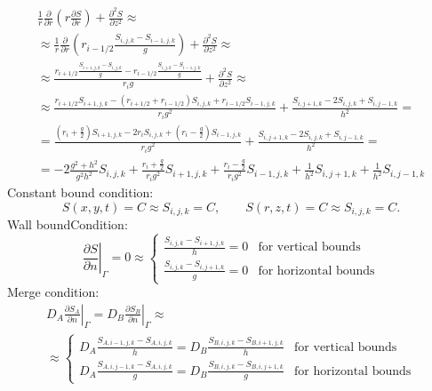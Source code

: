 \documentclass[a4paper,10pt]{article}
\begin{document}
\begin{multline}\label{eq.im2d.diffusion.cylindrical}
    \frac{1}{r} \frac{\partial}{\partial r}
    \left( r \frac{\partial S}{\partial r} \right) +
    \frac{\partial^2 S}{\partial z^2}
    \approx
    \\%
    \approx
    \frac{1}{r}\frac{\partial}{\partial r}\left(r_{i-1/2} \frac{S_{i,j,k} - S_{i-1,j,k}}{g} \right) +
    \frac{\partial^2 S}{\partial z^2}
    \approx
    \\%
    \approx
    \frac{ r_{i+1/2}\frac{S_{i+1,j,k} - S_{i,j,k}}{g} - r_{i-1/2}\frac{S_{i,j,k} - S_{i-1,j,k}}{g}}{r_i g} +
    \frac{\partial^2 S}{\partial z^2}
    \approx
    \\%
    \approx
    \frac{ r_{i+1/2}S_{i+1,j,k} - (r_{i+1/2} + r_{i-1/2})S_{i,j,k} + r_{i-1/2} S_{i-1,j,k} }{r_i g^2} +
    \frac{S_{i,j+1,k} - 2 S_{i,j,k} + S_{i,j-1,k}}{h^2}
    =
    \\%
    =
    \frac{ (r_i + \frac{g}{2})S_{i+1,j,k} - 2 r_i S_{i,j,k} + (r_i - \frac{g}{2}) S_{i-1,j,k} }{r_i g^2} +
    \frac{S_{i,j+1,k} - 2 S_{i,j,k} + S_{i,j-1,k}}{h^2}
    =
    \\%
    =
    -2\frac{g^2 + h^2}{g^2 h^2}         S_{i,j,k}
    +\frac{r_i + \frac{g}{2}}{r_i g^2}  S_{i+1,j,k}
    +\frac{r_i - \frac{g}{2}}{r_i g^2}  S_{i-1,j,k}
    +\frac{1}{h^2}                      S_{i,j+1,k}
    +\frac{1}{h^2}                      S_{i,j-1,k}
\end{multline}
%
%
%
Constant bound condition:
\begin{equation}
    S(x, y, t) = C \approx S_{i,j,k} = C,
    \qquad
    S(r, z, t) = C \approx S_{i,j,k} = C.
\end{equation}
Wall boundCondition:
\begin{equation}
    \left.\frac{\partial S}{\partial n}\right|_{\Gamma} = 0
    \approx
    \begin{cases}
        \frac{S_{i,j,k} - S_{i+1,j,k}}{h} = 0 & \text{for vertical bounds}\\
        \frac{S_{i,j,k} - S_{i,j+1,k}}{g} = 0 & \text{for horizontal bounds}
    \end{cases}
\end{equation}
Merge condition:
\begin{multline}
    D_A \left.\frac{\partial S_A}{\partial n}\right|_{\Gamma} =
    D_B \left.\frac{\partial S_B}{\partial n}\right|_{\Gamma}
    \approx\\\approx
    \begin{cases}
        D_A \frac{S_{A,i-1,j,k} - S_{A,i,j,k}}{h} =
        D_B \frac{S_{B,i,j,k} - S_{B,i+1,j,k}}{h} & \text{for vertical bounds}\\
        D_A \frac{S_{A,i,j-1,k} - S_{A,i,j,k}}{g} =
        D_B \frac{S_{B,i,j,k} - S_{B,i,j+1,k}}{g} & \text{for horizontal bounds}
    \end{cases}
\end{multline}
\end{document}
